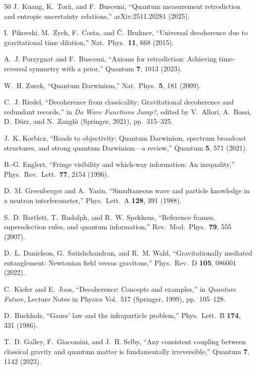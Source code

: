\documentclass[prl,twocolumn,superscriptaddress,longbibliography,floatfix]{revtex4-2}
\begin{document}
\begin{thebibliography}{50}
J.~Kuang, K.~Torii, and F.~Buscemi,
``Quantum measurement retrodiction and entropic uncertainty
relations,''
arXiv:2511.20281 (2025).

I.~Pikovski, M.~Zych, F.~Costa, and \v{C}.~Brukner,
``Universal decoherence due to gravitational time dilation,''
Nat.\ Phys.\ \textbf{11}, 668 (2015).

A.~J. Parzygnat and F.~Buscemi,
``Axioms for retrodiction: Achieving time-reversal symmetry with a
prior,''
Quantum \textbf{7}, 1013 (2023).

W.~H. Zurek,
``Quantum Darwinism,''
Nat.\ Phys.\ \textbf{5}, 181 (2009).

C.~J. Riedel,
``Decoherence from classicality: Gravitational decoherence
and redundant records,''
in \emph{Do Wave Functions Jump?}, edited by V.~Allori,
A.~Bassi, D.~D\"urr, and N.~Zangh\`{\i}
(Springer, 2021), pp.~315--325.

J.~K. Korbicz,
``Roads to objectivity: Quantum Darwinism, spectrum broadcast
structures, and strong quantum Darwinism---a review,''
Quantum \textbf{5}, 571 (2021).

B.-G. Englert,
``Fringe visibility and which-way information: An inequality,''
Phys.\ Rev.\ Lett.\ \textbf{77}, 2154 (1996).

D.~M. Greenberger and A.~Yasin,
``Simultaneous wave and particle knowledge in a neutron
interferometer,''
Phys.\ Lett.\ A \textbf{128}, 391 (1988).

S.~D. Bartlett, T.~Rudolph, and R.~W. Spekkens,
``Reference frames, superselection rules, and quantum information,''
Rev.\ Mod.\ Phys.\ \textbf{79}, 555 (2007).

D.~L. Danielson, G.~Satishchandran, and R.~M. Wald,
``Gravitationally mediated entanglement: Newtonian field versus
gravitons,''
Phys.\ Rev.\ D \textbf{105}, 086001 (2022).

C.~Kiefer and E.~Joos,
``Decoherence: Concepts and examples,''
in \emph{Quantum Future}, Lecture Notes in Physics Vol.~517
(Springer, 1999), pp.~105--128.

D.~Buchholz,
``Gauss' law and the infraparticle problem,''
Phys.\ Lett.\ B \textbf{174}, 331 (1986).

T.~D. Galley, F.~Giacomini, and J.~H. Selby,
``Any consistent coupling between classical gravity and quantum
matter is fundamentally irreversible,''
Quantum \textbf{7}, 1142 (2023).


\end{thebibliography}
\end{document}
